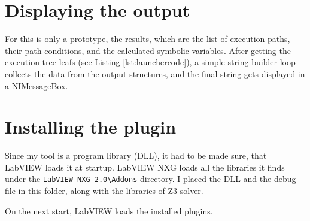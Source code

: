 \section{Displaying the output}
For this is only a prototype, the results, which are the list of execution paths, their path conditions, and the calculated symbolic variables. After getting the execution tree leafs (see Listing \ref{lst:launchercode}), a simple string builder loop collects the data from the output structures, and the final string gets displayed in a \underline{NIMessageBox}.

\section{Installing the plugin}
Since my tool is a program library (DLL), it had to be made sure, that LabVIEW loads it at startup. LabVIEW NXG loads all the libraries it finds under the \verb|LabVIEW NXG 2.0\Addons| directory. I placed the DLL and the debug file in this folder, along with the libraries of Z3 solver.

On the next start, LabVIEW loads the installed plugins.